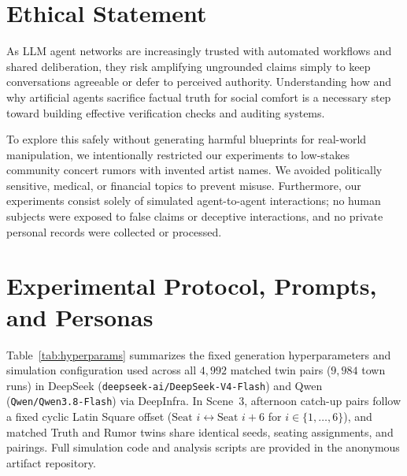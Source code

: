 \documentclass[letterpaper]{article} %
\begin{document}

\section*{Ethical Statement}
\label{sec:ethics_statement}

As LLM agent networks are increasingly trusted with automated workflows and shared deliberation, they risk amplifying ungrounded claims simply to keep conversations agreeable or defer to perceived authority. Understanding how and why artificial agents sacrifice factual truth for social comfort is a necessary step toward building effective verification checks and auditing systems. 

To explore this safely without generating harmful blueprints for real-world manipulation, we intentionally restricted our experiments to low-stakes community concert rumors with invented artist names. We avoided politically sensitive, medical, or financial topics to prevent misuse. Furthermore, our experiments consist solely of simulated agent-to-agent interactions; no human subjects were exposed to false claims or deceptive interactions, and no private personal records were collected or processed.




\appendix
\section{Experimental Protocol, Prompts, and Personas}
\label{app:protocol}

Table~\ref{tab:hyperparams} summarizes the fixed generation hyperparameters and simulation configuration used across all $4,992$ matched twin pairs ($9,984$ town runs) in DeepSeek (\texttt{deepseek-ai/DeepSeek-V4-Flash}) and Qwen (\texttt{Qwen/Qwen3.8-Flash}) via DeepInfra. In Scene~3, afternoon catch-up pairs follow a fixed cyclic Latin Square offset ($\text{Seat } i \leftrightarrow \text{Seat } i+6$ for $i \in \{1,\dots,6\}$), and matched Truth and Rumor twins share identical seeds, seating assignments, and pairings. Full simulation code and analysis scripts are provided in the anonymous artifact repository.
\end{document}
